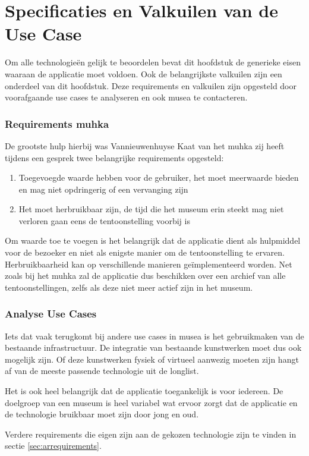 \chapter{Specificaties en Valkuilen van de Use Case}
\label{ch:requirements}

Om alle technologieën gelijk te beoordelen bevat dit hoofdstuk de generieke eisen waaraan de applicatie moet voldoen. Ook de belangrijkste valkuilen zijn een onderdeel van dit hoofdstuk. Deze requirements en valkuilen zijn opgesteld door voorafgaande use cases te analyseren en ook musea te contacteren. 


\subsection{Requirements \acrshort{muhka}}
De grootste hulp hierbij was Vannieuwenhuyse Kaat van het \acrlong{muhka} zij heeft tijdens een gesprek twee belangrijke requirements opgesteld: 

\begin{enumerate}
    \item Toegevoegde waarde hebben voor de gebruiker, het moet meerwaarde bieden en mag niet opdringerig of een vervanging zijn 
    \item Het moet herbruikbaar zijn, de tijd die het museum erin steekt mag niet verloren gaan eens de tentoonstelling voorbij is 
\end{enumerate}

Om waarde toe te voegen is het belangrijk dat de applicatie dient als hulpmiddel voor de bezoeker en niet als enigste manier om de tentoonstelling te ervaren. Herbruikbaarheid kan op verschillende manieren geïmplementeerd worden. Net zoals bij het \acrshort{muhka} zal de applicatie dus beschikken over een archief van alle tentoonstellingen, zelfs als deze niet meer actief zijn in het museum. 

\subsection{Analyse Use Cases}
Iets dat vaak terugkomt bij andere use cases in musea is het gebruikmaken van de bestaande infrastructuur. De integratie van bestaande kunstwerken moet dus ook mogelijk zijn. Of deze kunstwerken fysiek of virtueel aanwezig moeten zijn hangt af van de meeste passende technologie uit de longlist.

Het is ook heel belangrijk dat de applicatie toegankelijk is voor iedereen. De doelgroep van een museum is heel variabel wat ervoor zorgt dat de applicatie en de technologie bruikbaar moet zijn door jong en oud.

Verdere requirements die eigen zijn aan de gekozen technologie zijn te vinden in sectie \ref{sec:arrequirements}.